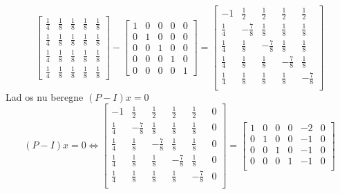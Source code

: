 \documentclass[10pt,a4paper]{article}
\begin{document}
\begin{enumerate}
\[\begin{bmatrix}
		\frac{1}{4} & \frac{1}{8} & \frac{1}{8} & \frac{1}{8} & \frac{1}{8}\\
		\frac{1}{4} & \frac{1}{8} & \frac{1}{8} & \frac{1}{8} & \frac{1}{8}\\
		\frac{1}{4} & \frac{1}{8} & \frac{1}{8} & \frac{1}{8} & \frac{1}{8}\\
		\frac{1}{4} & \frac{1}{8} & \frac{1}{8} & \frac{1}{8} & \frac{1}{8}
	\end{bmatrix}-
	\begin{bmatrix}
		1 & 0 & 0 & 0 & 0 \\
		0 & 1 & 0 & 0 & 0 \\
		0 & 0 & 1 & 0 & 0 \\
		0 & 0 & 0 & 1 & 0 \\
		0 & 0 & 0 & 0 & 1
	\end{bmatrix}
	=
	\begin{bmatrix}
		-1 & \frac{1}{2} & \frac{1}{2} & \frac{1}{2} & \frac{1}{2} \\
		\frac{1}{4} & -\frac{7}{8} & \frac{1}{8} & \frac{1}{8} & \frac{1}{8} \\
		\frac{1}{4} & \frac{1}{8} & -\frac{7}{8} & \frac{1}{8} & \frac{1}{8} \\
		\frac{1}{4} & \frac{1}{8} & \frac{1}{8} & -\frac{7}{8} & \frac{1}{8} \\
		\frac{1}{4} & \frac{1}{8} & \frac{1}{8} & \frac{1}{8} & -\frac{7}{8} \\
	\end{bmatrix}
	\]
	Lad os nu beregne $(P-I)x=0$
	\[
	(P-I)x=0 \Longleftrightarrow 
	\begin{bmatrix}
		-1 & \frac{1}{2} & \frac{1}{2} & \frac{1}{2} & \frac{1}{2} & 0 \\
		\frac{1}{4} & -\frac{7}{8} & \frac{1}{8} & \frac{1}{8} & \frac{1}{8} & 0 \\
		\frac{1}{4} & \frac{1}{8} & -\frac{7}{8} & \frac{1}{8} & \frac{1}{8} & 0 \\
		\frac{1}{4} & \frac{1}{8} & \frac{1}{8} & -\frac{7}{8} & \frac{1}{8} & 0 \\
		\frac{1}{4} & \frac{1}{8} & \frac{1}{8} & \frac{1}{8} & -\frac{7}{8} & 0 \\
	\end{bmatrix}
	=
	\begin{bmatrix}
		1 & 0 & 0 & 0 & -2 & 0 \\
		0 & 1 & 0 & 0 & -1 & 0 \\
		0 & 0 & 1 & 0 & -1 & 0 \\
		0 & 0 & 0 & 1 & -1 & 0 \\

\end{bmatrix}\]
\end{enumerate}
\end{document}
